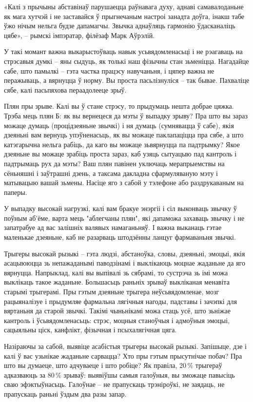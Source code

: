 «Калі з прычыны абставінаў парушаецца раўнавага духу, аднаві самавалоданьне як мага хутчэй і не заставайся ў прыгнечаным настроі занадта доўга, інакш табе ўжо нічым нельга будзе дапамагчы. Звычка аднаўляць гармонію ўдасканаліць цябе», – рымскі імпэратар, філёзаф Марк Аўрэлій.

У такі момант важна выкарыстоўваць навык усьвядомленасьці і не рэагаваць на стрэсавыя думкі – яны сыдуць, як толькі наш фізычны стан зьменіцца. Нагадайце сабе, што памылкі – гэта частка працэсу навучаньня, і цяпер важна не перажываць, а вярнуцца ў норму. Вы проста пасьлізнуліся – так бывае. Пахваліце сябе, калі пасьпяхова пераадолееце зрыў.

Плян пры зрыве. Калі вы ў стане стрэсу, то прыдумаць нешта добрае цяжка. Трэба мець плян Б: як вы вернецеся да мэты ў выпадку зрыву? Пра што вы зараз можаце думаць (процідзеяньне звычкі) і ня думаць (сумнявацца ў сабе), якія дзеяньні вам вернуць упэўненасьць, як вы можаце паклапаціцца пра сябе, а што катэгарычна нельга рабіць, да каго вы можаце зьвярнуцца па падтрымку? Якое дзеяньне вы можаце зрабіць проста зараз, каб узяць сытуацыю пад кантроль і падтрымаць рух да мэты? Ваш плян павінен уключаць мерапрыемствы на сёньняшні і заўтрашні дзень, а таксама дакладна сфармуляваную мэту і матывацыю вашай зьмены. Насіце яго з сабой у тэлефоне або раздрукаваным на паперы.

У выпадку высокай нагрузкі, калі вам бракуе энэргіі і сіл выконваць звычку ў поўным аб'ёме, варта мець "аблегчаны плян", які дапаможа захаваць звычку і не запатрабуе ад вас залішніх валявых намаганьняў. І важна выканаць гэтае маленькае дзеяньне, каб не разарваць штодзённы ланцуг фармаваньня звычкі.

Трыгеры высокай рызыкі – гэта людзі, абстаноўка, словы, дзеяньні, эмоцыі, якія асацыююцца зь непажаданымі паводзінамі і выклікаюць моцнае жаданьне да яго вярнуцца. Напрыклад, калі вы выпівалі зь сябрамі, то сустрэча зь імі можа выклікаць такое жаданьне. Большасьць раньніх зрываў выкліканая менавіта старымі трыгерамі. Пры гэтым дзеяньне трыгера неўсьвядомленае, мозг рацыяналізуе і прыдумляе фармальна лягічныя нагоды, падставы і зачэпкі для вяртаньня да старой звычкі. Такімі чыньнікамі можа стаць усё, што зьніжае кантроль і ўсьвядомленасьць: стрэс, моцныя станоўчыя і адмоўныя эмоцыі, сацыяльны ціск, канфлікт, фізычная і псыхалягічная цяга.

Назіраючы за сабой, выявіце асабістыя трыгеры высокай рызыкі. Запішыце, дзе і калі ў вас узьнікае жаданьне сарвацца? Хто пры гэтым прысутнічае побач? Пра што вы думаеце, што адчуваеце і што робіце? Як правіла, 20\,\% трыгераў адказваюць за 80\,\% зрываў: выявіўшы самыя галоўныя, вы зможаце павысіць сваю эфэктыўнасьць. Галоўнае – не прапускаць трэніроўкі, не заядаць, не прапускаць раньні ўздым два разы запар.


